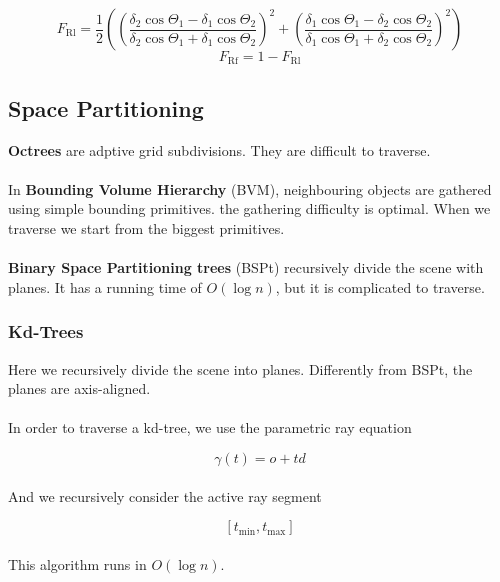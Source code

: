 \documentclass{article}
\begin{document}
\[ F_{\text{Rl}} = \frac{1}{2} \left( \left( \frac{\delta_2 \cos\Theta_1 - \delta_1 \cos \Theta_2}{\delta_2 \cos\Theta_1 + \delta_1 \cos \Theta_2} \right)^2 + \left( \frac{\delta_1 \cos\Theta_1 - \delta_2 \cos \Theta_2}{\delta_1 \cos\Theta_1 + \delta_2 \cos \Theta_2} \right)^2 \right) \]
\[ F_{\text{Rf}} = 1 - F_{\text{Rl}} \]

\subsection{Space Partitioning}
\textbf{Octrees} are adptive grid subdivisions. They are difficult to traverse. \\ \\
In \textbf{Bounding Volume Hierarchy} (BVM), neighbouring objects are gathered using simple bounding primitives. the gathering difficulty is optimal. When we traverse we start from the biggest primitives. \\ \\
\textbf{Binary Space Partitioning trees} (BSPt) recursively divide the scene with planes. It has a running time of $O(\log n)$, but it is complicated to traverse.

\subsubsection{Kd-Trees}
Here we recursively divide the scene into planes. Differently from BSPt, the planes are axis-aligned. \\ \\
In order to traverse a kd-tree, we use the parametric ray equation

\[ \gamma(t) = o + td \] \\
And we recursively consider the active ray segment

\[ [t_{\min}, t_{\max} ] \] \\
This algorithm runs in $O(\log n)$.
\end{document}
